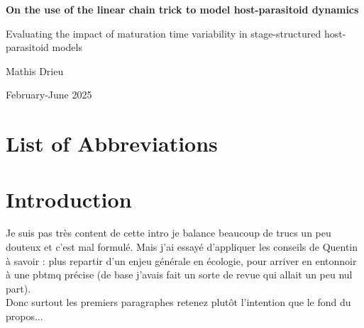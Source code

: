 \documentclass[12pt,a4paper,onecolumn]{article}
\newcommand{\noPageNumber}{\thispagestyle{empty}}
\begin{document}

\noPageNumber
\begin{titlepage}
\centering
\vspace*{3cm}
{\Huge \bfseries On the use of the linear chain trick to model host-parasitoid dynamics \par}
{\Huge Evaluating the impact of maturation time variability in stage-structured host-parasitoid models \par}
\vspace{2cm}
{\Large Mathis Drieu \par}
\vfill
February-June 2025
\end{titlepage}

\noPageNumber
\begin{abstract}
xxx
\end{abstract}

\noPageNumber
\tableofcontents
\newpage
\noPageNumber

\section*{List of Abbreviations}
\noPageNumber

\newpage
\setcounter{page}{1}






\section{Introduction}

Je suis pas très content de cette intro je balance beaucoup de trucs un peu douteux et c'est mal formulé. Mais j'ai essayé d'appliquer les conseils de Quentin à savoir : plus repartir d'un enjeu générale en écologie, pour arriver en entonnoir à une pbtmq précise (de base j'avais fait un sorte de revue qui allait un peu nul part). \\ 

Donc surtout les premiers paragraphes retenez plutôt l'intention que le fond du propos... \\
\end{document}
